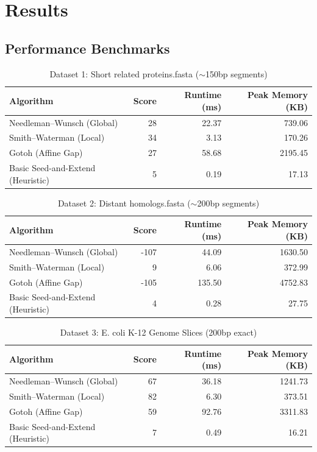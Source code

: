 \documentclass[Assignment,MME,english]{twbook}
\begin{document}
\chapter{Results}

\section{Performance Benchmarks}

\begin{table}[H]
\centering
\caption{Dataset 1: Short related proteins.fasta ($\sim$150bp segments)}
\begin{tabular}{lrrr}
\hline
Algorithm & Score & Runtime (ms) & Peak Memory (KB) \\
\hline
Needleman--Wunsch (Global) & 28 & 22.37 & 739.06 \\
Smith--Waterman (Local) & 34 & 3.13 & 170.26 \\
Gotoh (Affine Gap) & 27 & 58.68 & 2195.45 \\
Basic Seed-and-Extend (Heuristic) & 5 & 0.19 & 17.13 \\
\hline
\end{tabular}
\end{table}

\begin{table}[H]
\centering
\caption{Dataset 2: Distant homologs.fasta ($\sim$200bp segments)}
\begin{tabular}{lrrr}
\hline
Algorithm & Score & Runtime (ms) & Peak Memory (KB) \\
\hline
Needleman--Wunsch (Global) & -107 & 44.09 & 1630.50 \\
Smith--Waterman (Local) & 9 & 6.06 & 372.99 \\
Gotoh (Affine Gap) & -105 & 135.50 & 4752.83 \\
Basic Seed-and-Extend (Heuristic) & 4 & 0.28 & 27.75 \\
\hline
\end{tabular}
\end{table}

\begin{table}[H]
\centering
\caption{Dataset 3: E. coli K-12 Genome Slices (200bp exact)}
\begin{tabular}{lrrr}
\hline
Algorithm & Score & Runtime (ms) & Peak Memory (KB) \\
\hline
Needleman--Wunsch (Global) & 67 & 36.18 & 1241.73 \\
Smith--Waterman (Local) & 82 & 6.30 & 373.51 \\
Gotoh (Affine Gap) & 59 & 92.76 & 3311.83 \\
Basic Seed-and-Extend (Heuristic) & 7 & 0.49 & 16.21 \\
\hline
\end{tabular}
\end{table}
\end{document}
